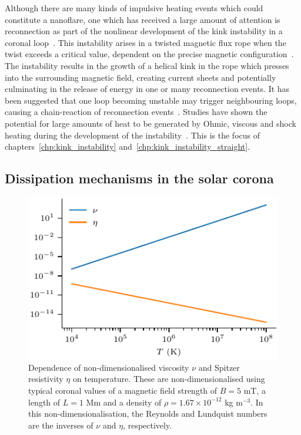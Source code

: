 Although there are many kinds of impulsive heating events which could constitute a nanoflare, one which has received a large amount of attention is reconnection as part of the nonlinear development of the kink instability in a coronal loop~\cite{hoodKinkInstabilitySolar1979,browningSolarCoronalHeating2003c,hoodCoronalHeatingMagnetic2009,browningHeatingCoronaNanoflares2008a}. This instability arises in a twisted magnetic flux rope when the twist exceeds a critical value, dependent on the precise magnetic configuration~\cite{hoodCoronalHeatingMagnetic2009}. The instability results in the growth of a helical kink in the rope which presses into the surrounding magnetic field, creating current sheets and potentially culminating in the release of energy in one or many reconnection events. It has been suggested that one loop becoming unstable may trigger neighbouring loops, causing a chain-reaction of reconnection events~\cite{hoodMHDAvalancheModel2015}. Studies have shown the potential for large amounts of heat to be generated by Ohmic, viscous and shock heating during the development of the instability~\cite{barefordShockHeatingNumerical2015,hoodCoronalHeatingMagnetic2009}. This is the focus of chapters~\ref{chp:kink_instability} and~\ref{chp:kink_instability_straight}.

\subsection{Dissipation mechanisms in the solar corona}

\begin{figure}[t]
  \centering
  \includegraphics[width=0.5\linewidth]{visc_dep_on_temp.pdf}
  \caption{Dependence of non-dimensionalised viscosity $\nu$ and Spitzer resistivity $\eta$ on temperature. These are non-dimensionalised using typical coronal values of a magnetic field strength of $B = 5$ mT, a length of $L = 1$ Mm and a density of $\rho = 1.67 \times 10^{-12}$ kg m$^{-3}$. In this non-dimensionalisation, the Reynolds and Lundquist numbers are the inverses of $\nu$ and $\eta$, respectively.}
  \label{fig:visc_dep_on_temp}
\end{figure}

